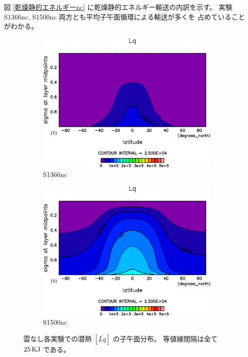 \documentclass[body]{subfiles}
\begin{document}
図 \ref{乾燥静的エネルギーnc} に乾燥静的エネルギー輸送の内訳を示す。
実験 S1366nc, S1500nc 両方とも平均子午面循環による輸送が多くを
占めていることがわかる。

\afterpage{\clearpage}

\begin{figure}[t]
	\centering
	\begin{subfigure}{.4\textwidth}
		\centering
		\includegraphics[width=\textwidth]{S1366-nc/Lq,time=3650:4015-crop-rotate.pdf}
		\caption{S1366nc}\label{LqS1366nc}
	\end{subfigure}
	\begin{subfigure}{.4\textwidth}
		\centering
		\includegraphics[width=\textwidth]{S1500-nc/Lq,time=3650:4015-crop-rotate.pdf}
		\caption{S1500nc}\label{LqS1500nc}
	\end{subfigure}
	\caption[雲なし各実験での潜熱の子午面分布]{
		雲なし各実験での潜熱 \([\overline{Lq}]\) の子午面分布。
		等値線間隔は全て \(25\hmu{KJ}\) である。
	}\label{Lqnc}
\end{figure}
\end{document}
